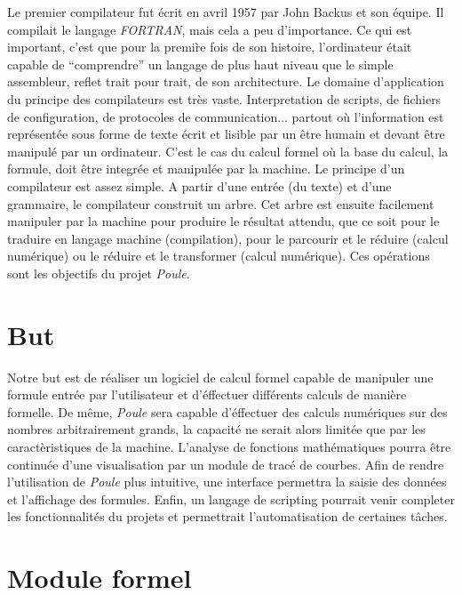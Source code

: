 \documentclass[french,12pt]{report}
\begin{document}
Le premier  compilateur fut \'ecrit en  avril 1957 par  John Backus et
son \'equipe. Il compilait le  langage \emph{FORTRAN}, mais cela a peu
d'importance. Ce qui  est important, c'est que pour  la premi\`re fois
de  son histoire,  l'ordinateur \'etait  capable de  ``comprendre'' un
langage de  plus haut  niveau que le  simple assembleur,  reflet trait
pour trait, de son  architecture. Le domaine d'application du principe
des  compilateurs  est tr\`es  vaste.  Interpretation  de scripts,  de
fichiers de  configuration, de protocoles  de communication... partout
o\`u l'information est repr\'esent\'ee  sous forme de texte \'ecrit et
lisible  par un  \^etre  humain  et devant  \^etre  manipul\'e par  un
ordinateur. C'est le  cas du calcul formel o\`u la  base du calcul, la
formule,  doit \^etre integr\'ee  et manipul\'ee  par la  machine.  Le
principe d'un  compilateur est assez  simple. A partir  d'une entr\'ee
(du texte) et d'une grammaire,  le compilateur construit un arbre. Cet
arbre est ensuite facilement manipuler par la machine pour produire le
r\'esultat attendu,  que ce soit  pour le traduire en  langage machine
(compilation), pour le parcourir  et le r\'eduire (calcul num\'erique)
ou  le   r\'eduire  et   le  transformer  (calcul   num\'erique).  Ces
op\'erations sont les objectifs du projet \emph{Poule}.

\section{But}

Notre but  est de r\'ealiser un  logiciel de calcul  formel capable de
manipuler  une  formule entr\'ee  par  l'utilisateur et  d'\'effectuer
diff\'erents  calculs de mani\`ere  formelle. De  m\^eme, \emph{Poule}
sera capable  d'\'effectuer des  calculs num\'eriques sur  des nombres
arbitrairement grands, la capacit\'e ne serait alors limit\'ee que par
les  caract\`eristiques   de  la  machine.    L'analyse  de  fonctions
math\'ematiques pourra  \^etre continu\'ee d'une  visualisation par un
module  de  trac\'e  de  courbes.  Afin  de  rendre  l'utilisation  de
\emph{Poule}  plus intuitive,  une interface  permettra la  saisie des
donn\'ees et l'affichage des  formules. Enfin, un langage de scripting
pourrait   venir  completer  les   fonctionnalit\'es  du   projets  et
permettrait l'automatisation de certaines t\^aches.

\section{Module formel}
\end{document}
